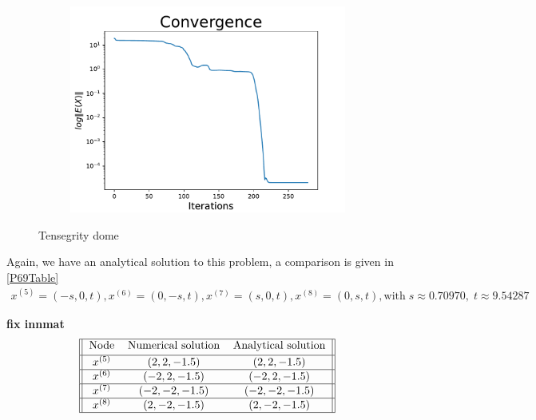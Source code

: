 \begin{figure}[!ht]
\begin{subfigure}{.72\textwidth}
\end{subfigure}%
\begin{subfigure}{.3\textwidth}
  \centering
  \includegraphics[width=0.99\linewidth]{Bilder/P69conv.pdf}
  \label{fig:sub2}
\end{subfigure}
\caption{Tensegrity dome}
\label{P69}
\end{figure}





Again, we have an analytical solution to this problem, a comparison is given in \eqref{P69Table} 
\begin{equation*}
    \begin{gathered}
    x^{(5)} = (-s,0,t),x^{(6)} = (0,-s,t),x^{(7)} = (s,0,t),x^{(8)} = (0,s,t),  \text{with}\; s \approx 0.70970, \; t \approx 9.54287
    \end{gathered}
\end{equation*}

\textbf{fix innmat}
\begin{gather}    
\label{P69Table}
\begin{tabular}{||c c c||} 
 \hline
 Node & Numerical solution & Analytical solution \\ [0.5ex] 
 \hline
$x^{(5)}$ & $(2,2,-1.5)$ & $(2,2,-1.5)$  \\ 
 \hline
 $x^{(6)}$ & $(-2,2,-1.5)$& $(-2,2,-1.5)$  \\ 
 \hline
 $x^{(7)}$ & $(-2,-2,-1.5)$ & $(-2,-2,-1.5)$\\ 
 \hline
 $x^{(8)}$ & $(2,-2,-1.5)$ & $(2,-2,-1.5)$ \\ 
 \hline
\end{tabular}
\end{gather}



